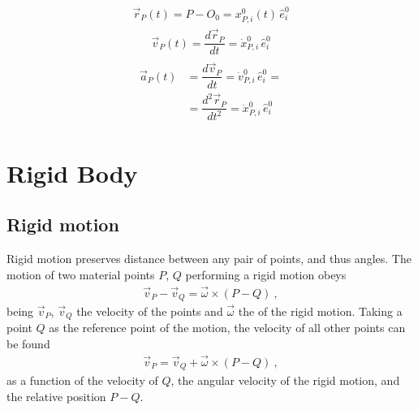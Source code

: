 \documentclass[letterpaper,10pt,english]{jupyterBook}
\begin{document}
\sphinxAtStartPar
{}
\begin{equation*}
\begin{split}\vec{r}_P(t) = P - O_0 = x^0_{P,i}(t) \, \hat{e}^0_i\end{split}
\end{equation*}
\sphinxAtStartPar
{}
\begin{equation*}
\begin{split}\vec{v}_P(t) = \dfrac{d \vec{r}_P}{dt} = \dot{x}^0_{P,i} \, \hat{e}^0_i\end{split}
\end{equation*}
\sphinxAtStartPar
{}
\begin{equation*}
\begin{split}\begin{aligned}
  \vec{a}_P(t)
  & = \dfrac{d \vec{v}_P}{dt}     = \dot{v}^0_{P,i} \, \hat{e}^0_i = \\
  & = \dfrac{d^2 \vec{r}_P}{dt^2} =\ddot{x}^0_{P,i} \, \hat{e}^0_i 
\end{aligned}\end{split}
\end{equation*}


\sphinxstepscope


\section{Rigid Body}
\label{\detokenize{ch/kinematics-rigid:rigid-body}}\label{\detokenize{ch/kinematics-rigid:classical-mechanics-kinematics-rigid-body}}\label{\detokenize{ch/kinematics-rigid::doc}}

\subsection{Rigid motion}
\label{\detokenize{ch/kinematics-rigid:rigid-motion}}
\sphinxAtStartPar
Rigid motion preserves distance between any pair of points, and thus angles. The motion of two material points \(P\), \(Q\) performing a rigid motion obeys
\begin{equation}\label{equation:ch/kinematics-rigid:eq:kin:rigid:vel}
\begin{split}\vec{v}_P - \vec{v}_Q = \vec{\omega} \times (P - Q) \ ,\end{split}
\end{equation}
\sphinxAtStartPar
being \(\vec{v}_P\), \(\vec{v}_Q\) the velocity of the points and \(\vec{\omega}\) the  of the rigid motion. Taking a point \(Q\) as the reference point of the motion, the velocity of all other points can be found
\begin{equation*}
\begin{split}\vec{v}_P = \vec{v}_Q + \vec{\omega} \times (P-Q) \ ,\end{split}
\end{equation*}
\sphinxAtStartPar
as a function of the velocity of \(Q\), the angular velocity of the rigid motion, and the relative position \(P-Q\).
\end{document}
